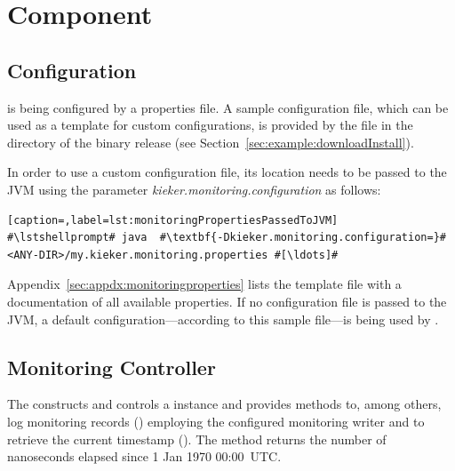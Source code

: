 % 


\chapter{\KiekerMonitoringPart{} Component}\label{chap:componentsMonitoring}


\section{\KiekerMonitoringPart{} Configuration}\label{sec:monitoring:configuration}

\KiekerMonitoringPart{} is being configured by a properties file. A sample %
configuration file, which can be used as a template for custom configurations, %
is provided by the file \file{\monitoringPropertiesFile} in the directory %
 of the binary release %
(see Section~\ref{sec:example:downloadInstall}). %

In order to use a custom configuration file, its location needs to be passed to %
the JVM using the parameter \textit{kieker.monitoring.configuration} as follows:

\setBashListing
\begin{lstlisting}[caption=,label=lst:monitoringPropertiesPassedToJVM]
#\lstshellprompt# java	#\textbf{-Dkieker.monitoring.configuration=}#<ANY-DIR>/my.kieker.monitoring.properties #[\ldots]#
\end{lstlisting}

\noindent Appendix~\ref{sec:appdx:monitoringproperties} lists the template file %
with a documentation of all available properties. If no configuration file %
is passed to the JVM, a default configuration---according to this sample file---is being %
used by \KiekerMonitoringPart{}. %

\section{Monitoring Controller}\label{sec:componentsMonitoring:monitoringController}

The  constructs and controls a \KiekerMonitoringPart{} %
instance and provides methods to, among others, log monitoring records %
() employing the configured monitoring writer and %
to retrieve the current timestamp (). %
The method  returns the number of nanoseconds elapsed %
since 1 Jan 1970 00:00~UTC. %

